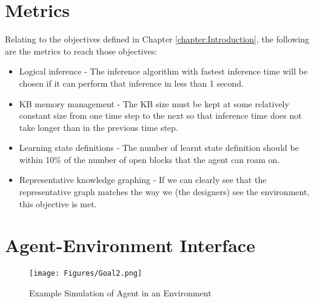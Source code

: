 
\section{Metrics}
Relating to the objectives defined in Chapter \ref{chapter:Introduction}, the following are the metrics to reach those objectives:

\begin{itemize}
 \item Logical inference - The inference algorithm with fastest inference time will be chosen if it can perform that inference in less than 1 second.
 \item KB memory management - The KB size must be kept at some relatively constant size from one time step to the next so that inference time does not take longer than in the previous time step.
 \item Learning state definitions - The number of learnt state definition should be within 10\% of the number of open blocks that the agent can roam on.
 \item Representative knowledge graphing - If we can clearly see that the representative graph matches the way we (the designers) see the environment, this objective is met.
\end{itemize}


\section{Agent-Environment Interface}

\begin{figure}[H]
    \centering
    \texttt{[image: Figures/Goal2.png]}
    \caption{Example Simulation of Agent in an Environment} 
    \label{fig:agent_in_env_low_level}
\end{figure}


